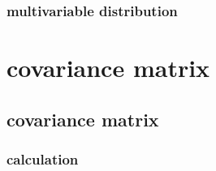 \documentclass[
]{book}
\theoremstyle{definition}
\theoremstyle{definition}
\theoremstyle{definition}
\theoremstyle{definition}
\theoremstyle{remark}
\begin{document}
\subsection{multivariable distribution}\label{multivariable-distribution}

\chapter{covariance matrix}\label{covariance-matrix}

\section{covariance matrix}\label{covariance-matrix-1}

\textsuperscript{}

\subsection{calculation}\label{calculation}
\end{document}
